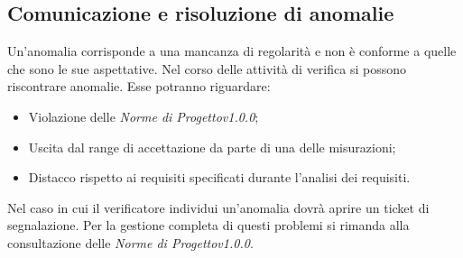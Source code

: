 \subsection{Comunicazione e risoluzione di anomalie}
Un'anomalia corrisponde a una mancanza di regolarità e non è conforme a quelle che sono le sue aspettative. Nel corso delle attività di verifica si possono riscontrare anomalie. Esse potranno riguardare:
\begin{itemize}
	\item Violazione delle \textit{Norme di Progettov1.0.0};
	\item Uscita dal range di accettazione da parte di una delle misurazioni;
	\item Distacco rispetto ai requisiti specificati durante l'analisi dei requisiti.
\end{itemize}
Nel caso in cui il verificatore individui un'anomalia dovrà aprire un ticket di segnalazione. Per la gestione completa di questi problemi si rimanda alla consultazione delle \textit{Norme di Progettov1.0.0}.

